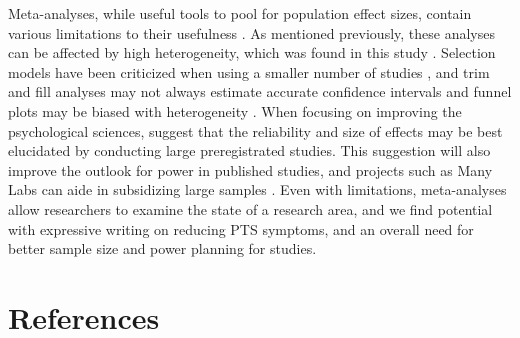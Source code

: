 \documentclass[english,man]{apa6}
\theoremstyle{definition}
\theoremstyle{definition}
\theoremstyle{definition}
\theoremstyle{remark}
\begin{document}
Meta-analyses, while useful tools to pool for population effect sizes,
contain various limitations to their usefulness \autocite{VanElk2015}.
As mentioned previously, these analyses can be affected by high
heterogeneity, which was found in this study \autocite{VanAert2016}.
Selection models have been criticized when using a smaller number of
studies \autocite{VanAssen2015}, and trim and fill analyses may not
always estimate accurate confidence intervals and funnel plots may be
biased with heterogeneity \autocite{Terrin2003}. When focusing on
improving the psychological sciences, \textcite{VanElk2015} suggest that
the reliability and size of effects may be best elucidated by conducting
large preregistrated studies. This suggestion will also improve the
outlook for power in published studies, and projects such as Many Labs
can aide in subsidizing large samples \autocite{Klein2014a}. Even with
limitations, meta-analyses allow researchers to examine the state of a
research area, and we find potential with expressive writing on reducing
PTS symptoms, and an overall need for better sample size and power
planning for studies.

\newpage

\section{References}\label{references}

\setlength{\parindent}{-0.5in} \setlength{\leftskip}{0.5in}

  \printbibliography
\end{document}
